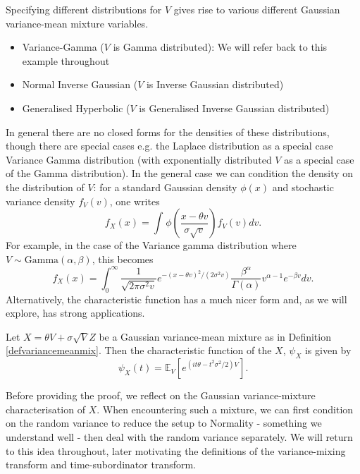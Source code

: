 \documentclass{article}
\begin{document}
\begin{examples}
    Specifying different distributions for $V$ gives rise to various different Gaussian variance-mean mixture variables.
    \begin{itemize}
        \item Variance-Gamma ($V$ is Gamma distributed): We will refer back to this example throughout 
        \item Normal Inverse Gaussian ($V$ is Inverse Gaussian distributed)
        \item Generalised Hyperbolic ($V$ is Generalised Inverse Gaussian distributed)
    \end{itemize}
\end{examples}

In general there are no closed forms for the densities of these distributions, though there are special cases e.g. the Laplace distribution as a special case Variance Gamma distribution (with exponentially distributed $V$ as a special case of the Gamma distribution). In the general case we can condition the density on the distribution of $V$: for a standard Gaussian density $\phi(x)$ and stochastic variance density $f_V(v)$, one writes
\begin{equation}\label{General VG Density}
    f_X(x) = \int_{}^{}\phi\left(\dfrac{x-\theta v}{\sigma\sqrt{v}}\right)f_V(v)dv.
\end{equation}
For example, in the case of the Variance gamma distribution where $V\sim \text{Gamma}(\alpha,\beta)$, this becomes
\begin{equation}
    f_X(x) = \int_{0}^{\infty}\frac{1}{\sqrt{2\pi\sigma^2v}}e^{-(x-\theta v)^2/{(2\sigma^2v)}}\dfrac{\beta^\alpha}{\Gamma(\alpha)}v^{\alpha-1}e^{-\beta v}dv.
\end{equation}
Alternatively, the characteristic function has a much nicer form and, as we will explore, has strong applications.
\begin{prop}\label{aVGcf}
    Let $X = \theta V + \sigma\sqrt{V}Z$ be a Gaussian variance-mean mixture as in Definition \ref{defvariancemeanmix}. Then the characteristic function of the $X$, $\psi_X$ is given by
    \begin{equation}
        \psi_{X}(t) = \mathbb{E}_V\left[e^{(it\theta- t^2\sigma^2/2)V}\right].
    \end{equation}
\end{prop}
\begin{remark}\label{conditioning}
    Before providing the proof, we reflect on the Gaussian variance-mixture characterisation of $X$. When encountering such a mixture, we can first condition on the random variance to reduce the setup to Normality - something we understand well - then deal with the random variance separately. We will return to this idea throughout, later motivating the definitions of the variance-mixing transform and time-subordinator transform.
\end{remark}
\end{document}
